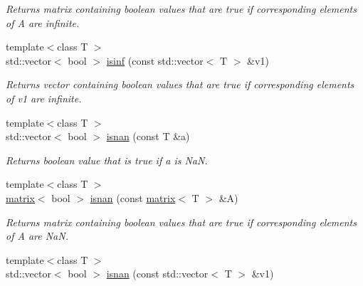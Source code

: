\begin{DoxyCompactItemize}
\begin{DoxyCompactList}\small\item\em Returns matrix containing boolean values that are true if corresponding elements of A are infinite. \end{DoxyCompactList}\item 
\hypertarget{namespacekeycpp_a34d8480a27e0e6d14d687054a221c0a5}{{\footnotesize template$<$class T $>$ }\\std\-::vector$<$ bool $>$ \hyperlink{namespacekeycpp_a34d8480a27e0e6d14d687054a221c0a5}{isinf} (const std\-::vector$<$ T $>$ \&v1)}\label{namespacekeycpp_a34d8480a27e0e6d14d687054a221c0a5}

\begin{DoxyCompactList}\small\item\em Returns vector containing boolean values that are true if corresponding elements of v1 are infinite. \end{DoxyCompactList}\item 
\hypertarget{namespacekeycpp_a6b5311cd26b6819f68c158d08c39d501}{{\footnotesize template$<$class T $>$ }\\std\-::vector$<$ bool $>$ \hyperlink{namespacekeycpp_a6b5311cd26b6819f68c158d08c39d501}{isnan} (const T \&a)}\label{namespacekeycpp_a6b5311cd26b6819f68c158d08c39d501}

\begin{DoxyCompactList}\small\item\em Returns boolean value that is true if a is Na\-N. \end{DoxyCompactList}\item 
\hypertarget{namespacekeycpp_ad3b16064066dc041be364e6fbefa173a}{{\footnotesize template$<$class T $>$ }\\\hyperlink{classkeycpp_1_1matrix}{matrix}$<$ bool $>$ \hyperlink{namespacekeycpp_ad3b16064066dc041be364e6fbefa173a}{isnan} (const \hyperlink{classkeycpp_1_1matrix}{matrix}$<$ T $>$ \&A)}\label{namespacekeycpp_ad3b16064066dc041be364e6fbefa173a}

\begin{DoxyCompactList}\small\item\em Returns matrix containing boolean values that are true if corresponding elements of A are Na\-N. \end{DoxyCompactList}\item 
\hypertarget{namespacekeycpp_a00160cff29da446de425d98ffafe8cb3}{{\footnotesize template$<$class T $>$ }\\std\-::vector$<$ bool $>$ \hyperlink{namespacekeycpp_a00160cff29da446de425d98ffafe8cb3}{isnan} (const std\-::vector$<$ T $>$ \&v1)}\label{namespacekeycpp_a00160cff29da446de425d98ffafe8cb3}


\end{DoxyCompactItemize}
